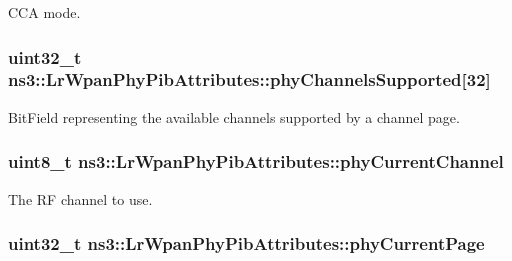 C\+CA mode. 

\subsubsection[{\texorpdfstring{phy\+Channels\+Supported}{phyChannelsSupported}}]{\setlength{\rightskip}{0pt plus 5cm}uint32\+\_\+t ns3\+::\+Lr\+Wpan\+Phy\+Pib\+Attributes\+::phy\+Channels\+Supported\mbox{[}32\mbox{]}}\hypertarget{structns3_1_1LrWpanPhyPibAttributes_a1bdcf71ffdbe0812d44d95ae2a5ae633}{}\label{structns3_1_1LrWpanPhyPibAttributes_a1bdcf71ffdbe0812d44d95ae2a5ae633}


Bit\+Field representing the available channels supported by a channel page. 

\subsubsection[{\texorpdfstring{phy\+Current\+Channel}{phyCurrentChannel}}]{\setlength{\rightskip}{0pt plus 5cm}uint8\+\_\+t ns3\+::\+Lr\+Wpan\+Phy\+Pib\+Attributes\+::phy\+Current\+Channel}\hypertarget{structns3_1_1LrWpanPhyPibAttributes_a8e620dfd0f5b45fa6c9525d93c498fcb}{}\label{structns3_1_1LrWpanPhyPibAttributes_a8e620dfd0f5b45fa6c9525d93c498fcb}


The RF channel to use. 

\subsubsection[{\texorpdfstring{phy\+Current\+Page}{phyCurrentPage}}]{\setlength{\rightskip}{0pt plus 5cm}uint32\+\_\+t ns3\+::\+Lr\+Wpan\+Phy\+Pib\+Attributes\+::phy\+Current\+Page}\hypertarget{structns3_1_1LrWpanPhyPibAttributes_aab22c5f1b6b07b53e6daedd0d2cc0332}{}\label{structns3_1_1LrWpanPhyPibAttributes_aab22c5f1b6b07b53e6daedd0d2cc0332}


